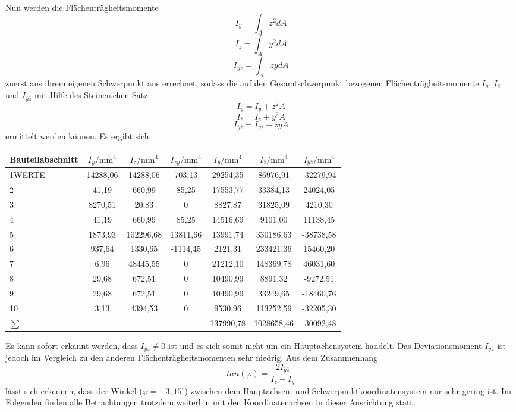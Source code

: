 Nun werden die Flächenträgheitsmomente 
\begin{equation}\label{FT1}
	I_{y} = \int_{A}^{}z^2dA
\end{equation}
\begin{equation}
I_{z} = \int_{A}^{}y^2dA
\end{equation}
\begin{equation}\label{FT3}
I_{yz} = \int_{A}^{}zydA
\end{equation}
 zuerst aus ihrem eigenen Schwerpunkt aus errechnet, sodass die auf den Gesamtschwerpunkt bezogenen Flächenträgheitsmomente $I_{\bar{y}}$, $I_{\bar{z}}$ und $I_{\bar{y}\bar{z}}$ mit Hilfe des Steinerschen Satz
 \begin{equation}
 	I_{\bar{y}} = I_{y} + z^2A
 \end{equation}
\begin{equation}
I_{\bar{z}} = I_{z} + y^2A
\end{equation}
\begin{equation}
I_{\bar{y}\bar{z}} = I_{yz} + zyA
\end{equation}
 ermittelt werden können.
Es ergibt sich:
\begin{center}

\begin{tabular}[h]{l|c|c|c||c|c|c}
Bauteilabschnitt&$I_{y}/\mathrm{mm}^4$&$I_{z}/\mathrm{mm}^4$&$I_{zy}/\mathrm{mm}^4$&$I_{\bar{y}}/\mathrm{mm}^4$&$I_{\bar{z}}/\mathrm{mm}^4$&$I_{\bar{y}\bar{z}}/\mathrm{mm}^4$\\
\hline
1WERTE&14288,06&14288,06&703,13&29254,35&86976,91&-32279,94\\
2&41,19&660,99&85,25&17553,77&33384,13&24024,05\\
3&8270,51&20,83&0&8827,87&31825,09&4210,30\\
4&41,19&660,99&85,25&14516,69&9101,00&11138,45\\
5&1873,93&102296,68&13811,66&13991,74&330186,63&-38738,58\\
6&937,64&1330,65&-1114,45&2121,31&233421,36&15460,20\\
7&6,96&48445,55&0&21212,10&148369,78&46031,60\\
8&29,68&672,51&0&10490,99&8891,32&-9272,51\\
9&29,68&672,51&0&10490,99&33249,65&-18460,76\\
10&3,13&4394,53&0&9530,96&113252,59&-32205,30\\
\hline
$\sum{}$&-&-&-&137990,78&1028658,46&-30092,48
\end{tabular}
\end{center}
Es kann sofort erkannt werden, dass $I_{\bar{y}\bar{z}} \neq 0$ ist und es sich somit nicht um ein Hauptachensystem handelt. Das Deviationsmoment  $I_{\bar{y}\bar{z}}$ ist jedoch im Vergleich zu den anderen Flächenträgheitsmomenten sehr niedrig. 
Aus dem Zusammenhang
\begin{equation}
	tan(\varphi)=\frac{2I_{\bar{y}\bar{z}}}{I_{\bar{z}}-I_{\bar{y}}}
\end{equation}
lässt sich erkennen, dass der Winkel ($\varphi =-3,15^\circ$) zwischen dem Hauptachsen- und Schwerpunktkoordinatensystem nur sehr gering ist. Im Folgenden finden alle Betrachtungen trotzdem weiterhin mit den Koordinatenachsen in dieser Ausrichtung statt.

